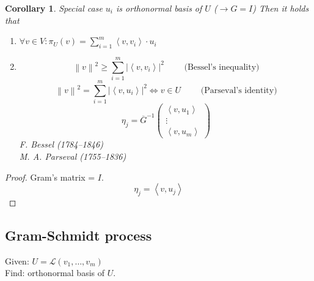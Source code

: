 \documentclass{article}
\newtheorem*{corollary}{Corollary}%
\newcommand{\ip}[2]{\left\langle#1,#2\right\rangle} %
\newcommand{\norm}[1]{\left\|#1\right\|}
\newcommand{\card}[1]{\left|#1\right|}
\begin{document}
\begin{corollary} %
  \label{ONRcor}
  Special case $u_i$ is orthonormal basis of $U$ ($\rightarrow G = I$)
  Then it holds that
  \begin{enumerate}
    \item $\forall v \in V: \pi_U(v) = \sum_{i=1}^m \ip{v}{v_i} \cdot u_i$
    \item
      \[ \norm{v}^2 \geq \sum_{i=1}^m \card{\ip{v}{v_i}}^2 \qquad \text{ (Bessel's inequality)} \]
      \[ \norm{v}^2 = \sum_{i=1}^m \card{\ip{v}{u_i}}^2 \iff v \in U \qquad \text{ (Parseval's identity)} \]
      \[ \eta_j = \overline{G}^{-1}\begin{pmatrix} \ip{v}{u_1} \\ \vdots \\ \ip{v}{u_m} \end{pmatrix} \]
      F. Bessel (1784--1846) \\
      M. A. Parseval (1755--1836)
  \end{enumerate}
\end{corollary}

\begin{proof}
  Gram's matrix = $I$.
  \[ \eta_j = \ip{v}{u_j} \]
\end{proof}

\subsection{Gram-Schmidt process}

Given: $U = \mathcal L(v_1, \ldots, v_m)$ \\
Find: orthonormal basis of $U$.
\end{document}
